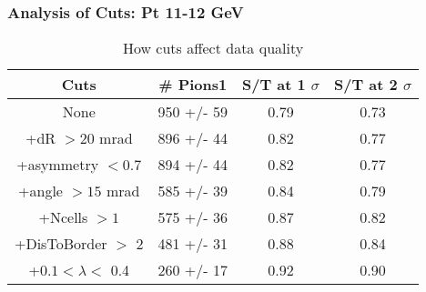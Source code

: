 \frame
{
\frametitle{Analysis of Cuts: Pt 11-12 GeV}
\begin{table}
\caption{How cuts affect data quality}
\centering
\begin{tabular}{c c c c}
\hline\hline
Cuts & \# Pions1 & S/T at 1 $\sigma$ & S/T at 2 $\sigma$ \\ [0.5ex]
\hline
None &  950 +/-   59 & 0.79 & 0.73 \\ %
+dR $> 20$ mrad &  896 +/-   44 & 0.82 & 0.77 \\ %
+asymmetry $< 0.7$ &  894 +/-   44 & 0.82 & 0.77 \\ %
+angle $> 15$ mrad &  585 +/-   39 & 0.84 & 0.79 \\ %
+Ncells $> 1$&  575 +/-   36 & 0.87 & 0.82 \\ %
+DisToBorder $>$ 2 &  481 +/-   31 & 0.88 & 0.84 \\ %
+$0.1 < \lambda <$ 0.4 &  260 +/-   17 & 0.92 & 0.90 \\ %
[1ex]
\hline
\end{tabular}
\label{table:nonlin}
\end{table}
}
